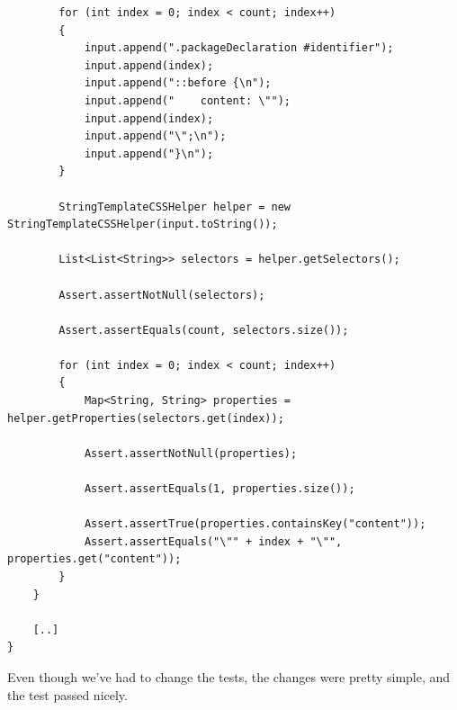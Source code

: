 \documentclass[11pt]{article}
\begin{document}
\begin{verbatim}
        for (int index = 0; index < count; index++)
        {
            input.append(".packageDeclaration #identifier");
            input.append(index);
            input.append("::before {\n");
            input.append("    content: \"");
            input.append(index);
            input.append("\";\n");
            input.append("}\n");
        }

        StringTemplateCSSHelper helper = new StringTemplateCSSHelper(input.toString());

        List<List<String>> selectors = helper.getSelectors();

        Assert.assertNotNull(selectors);

        Assert.assertEquals(count, selectors.size());

        for (int index = 0; index < count; index++)
        {
            Map<String, String> properties = helper.getProperties(selectors.get(index));

            Assert.assertNotNull(properties);

            Assert.assertEquals(1, properties.size());

            Assert.assertTrue(properties.containsKey("content"));
            Assert.assertEquals("\"" + index + "\"", properties.get("content"));
        }
    }

    [..]
}
\end{verbatim}

Even though we've had to change the tests, the changes were pretty simple, and the test passed nicely.
\end{document}
